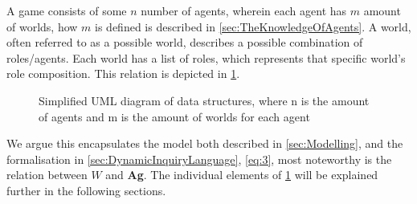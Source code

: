 A game consists of some $n$ number of agents, wherein each agent has $m$ amount
of worlds, how $m$ is defined is described in \cref{sec:TheKnowledgeOfAgents}.
A world, often referred to as a possible world, describes a possible
combination of roles/agents. Each world has a list of roles, which represents
that specific world's role composition. This relation is depicted in
\cref{fig:DataStructuresUML}. \renewcommand{\umlfillcolor}{white}
\renewcommand{\umldrawcolor}{blue}
\begin{figure}[H]
	\centering
	\vspace*{3mm}
	\caption{Simplified UML diagram of data structures, where n is the amount of agents and m is the amount of worlds for each agent}
	\label{fig:DataStructuresUML}
\end{figure}
We argue this encapsulates the model both described in \cref{sec:Modelling}, and the formalisation in
\cref{sec:DynamicInquiryLanguage}, \cref{eq:3}, most noteworthy is the relation between $W$ and \textbf{Ag}. The individual elements of \cref{fig:DataStructuresUML} will be explained further in the following sections.
